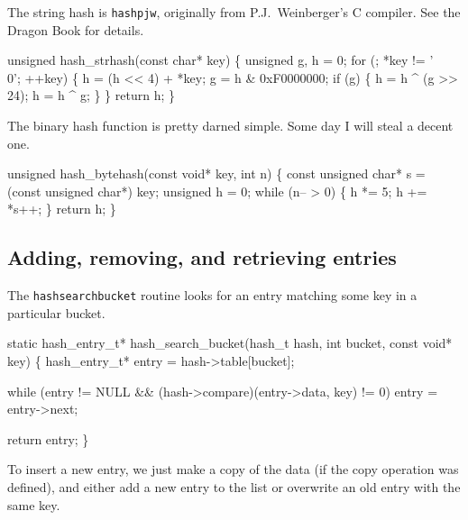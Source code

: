 The string hash is {\tt{}hashpjw}, originally from P.J.~Weinberger's
C compiler.  See the Dragon Book for details.

\nwenddocs{}\plusendmoddef
unsigned hash_strhash(const char* key)
\{
    unsigned g, h = 0;
    for (; *key != '\\0'; ++key) \{
        h = (h << 4) + *key;
        g = h & 0xF0000000;
        if (g) \{
            h = h ^ (g >> 24);
            h = h ^ g;
        \}
    \}
    return h;   
\}

\nwendcode{}\nwdocspar

The binary hash function is pretty darned simple.
Some day I will steal a decent one.

\nwenddocs{}\plusendmoddef
unsigned hash_bytehash(const void* key, int n)
\{
    const unsigned char* s = (const unsigned char*) key;
    unsigned h = 0;
    while (n-- > 0) \{
        h *= 5;
        h += *s++;
    \}
    return h;
\}

\nwendcode{}\nwdocspar

\subsection{Adding, removing, and retrieving entries}

The {\tt{}hash{}search{}bucket} routine looks for an entry matching
some key in a particular bucket.

\nwenddocs{}\plusendmoddef
static hash_entry_t* hash_search_bucket(hash_t hash, int bucket,
                                        const void* key)
\{
    hash_entry_t* entry = hash->table[bucket];

    while (entry != NULL && (hash->compare)(entry->data, key) != 0)
        entry = entry->next;

    return entry;
\}

\nwendcode{}\nwdocspar

To insert a new entry, we just make a copy of the data (if the copy
operation was defined), and either add a new entry to the list or
overwrite an old entry with the same key.

